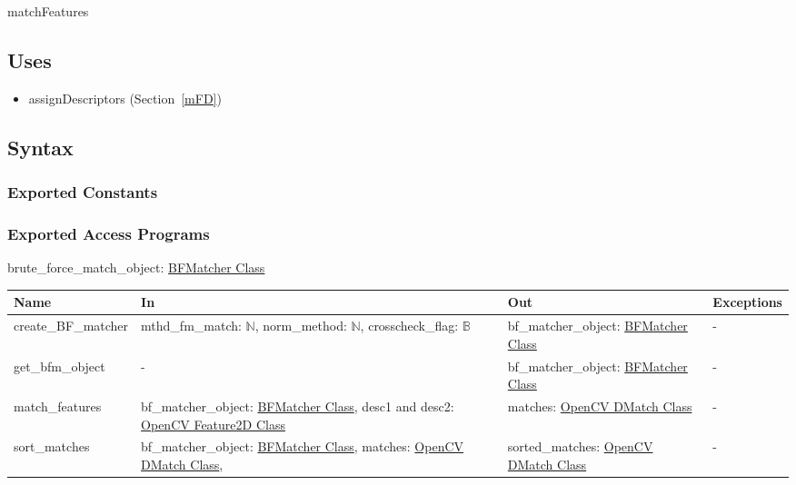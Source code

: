 \documentclass[12pt, titlepage]{article}
\begin{document}
matchFeatures

\subsection{Uses}
\begin{itemize}
  \item assignDescriptors (Section~\ref{mFD})
\end{itemize}

\subsection{Syntax}

\subsubsection{Exported Constants}

\subsubsection{Exported Access Programs}
brute\_force\_match\_object: \href{https://docs.opencv.org/3.4/d3/da1/classcv_1_1BFMatcher.html}{BFMatcher Class}
\begin{center}
\begin{tabular}{p{3.5cm} p{4cm} p{3.5cm} p{2.5cm}}
\hline
\textbf{Name} & \textbf{In} & \textbf{Out} & \textbf{Exceptions} \\
\hline
create\_BF\_matcher 
& mthd\_fm\_match: $\mathbb{N}$, \newline
norm\_method: $\mathbb{N}$, \newline
crosscheck\_flag: $\mathbb{B}$ 
& bf\_matcher\_object: \href{https://docs.opencv.org/3.4/d3/da1/classcv_1_1BFMatcher.html}{BFMatcher Class} 
& - \\
\hline
get\_bfm\_object 
& -
& bf\_matcher\_object: \href{https://docs.opencv.org/3.4/d3/da1/classcv_1_1BFMatcher.html}{BFMatcher Class} 
& - \\
\hline
match\_features 
& bf\_matcher\_object: \href{https://docs.opencv.org/3.4/d3/da1/classcv_1_1BFMatcher.html}{BFMatcher Class}, \newline
desc1 and desc2: \href{https://docs.opencv.org/4.x/d0/d13/classcv_1_1Feature2D.html}{OpenCV Feature2D Class}
& matches: \href{https://docs.opencv.org/3.4/d4/de0/classcv_1_1DMatch.html}{OpenCV DMatch Class} 
& - \\
\hline
sort\_matches & bf\_matcher\_object: \href{https://docs.opencv.org/3.4/d3/da1/classcv_1_1BFMatcher.html}{BFMatcher Class}, \newline 
matches: \href{https://docs.opencv.org/3.4/d4/de0/classcv_1_1DMatch.html}{OpenCV DMatch Class}, \newline 
& sorted\_matches: \href{https://docs.opencv.org/3.4/d4/de0/classcv_1_1DMatch.html}{OpenCV DMatch Class}
& - \\
\hline
\end{tabular}
\end{center}
\end{document}
